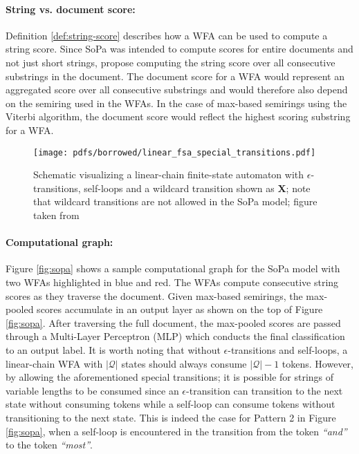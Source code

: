 \paragraph{String vs. document score:} Definition \ref{def:string-score}
describes how a WFA can be used to compute a string score. Since SoPa was
intended to compute scores for entire documents and not just short strings,
\citet{schwartz2018sopa} propose computing the string score over all consecutive
substrings in the document. The document score for a WFA would represent an
aggregated score over all consecutive substrings and would therefore also depend
on the semiring used in the WFAs. In the case of max-based semirings using the
Viterbi algorithm, the document score would reflect the highest scoring
substring for a WFA.

\begin{figure}[t]
  \centering
  \texttt{[image: pdfs/borrowed/linear\_fsa\_special\_transitions.pdf]}
  \caption{Schematic visualizing a linear-chain finite-state automaton with
    $\epsilon$-transitions, self-loops and a wildcard transition shown as
    \textbf{X}; note that wildcard transitions are not allowed in the SoPa
    model; figure taken from \citet{schwartz2018sopa}}
  \label{fig:fsa}
\end{figure}

\paragraph{Computational graph:} Figure \ref{fig:sopa} shows a sample
computational graph for the SoPa model with two WFAs highlighted in blue and
red. The WFAs compute consecutive string scores as they traverse the document.
Given max-based semirings, the max-pooled scores accumulate in an output layer
as shown on the top of Figure \ref{fig:sopa}. After traversing the full
document, the max-pooled scores are passed through a Multi-Layer Perceptron
(MLP) which conducts the final classification to an output label. It is worth
noting that without $\epsilon$-transitions and self-loops, a linear-chain WFA
with $|\mathcal{Q}|$ states should always consume $\mathcal{|Q|}-1$ tokens.
However, by allowing the aforementioned special transitions; it is possible for
strings of variable lengths to be consumed since an $\epsilon$-transition can
transition to the next state without consuming tokens while a self-loop can
consume tokens without transitioning to the next state. This is indeed the case
for Pattern 2 in Figure \ref{fig:sopa}, when a self-loop is encountered in the
transition from the token \textit{``and''} to the token \textit{``most''}.

